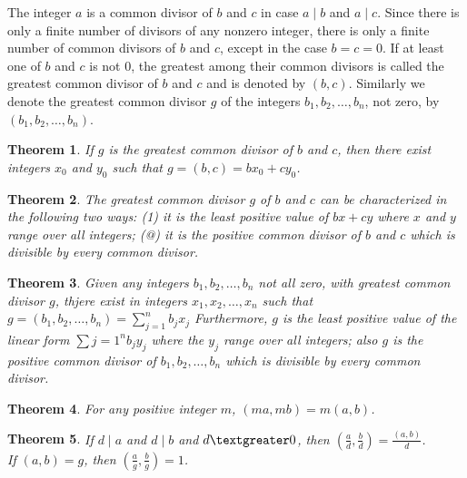 \documentclass[11pt]{article} %
\newtheorem{theorem}{Theorem}[section]
\newenvironment{definition}[1][Definition]{\begin{trivlist}
\item[\hskip \labelsep {\bfseries #1}]}{\end{trivlist}}
\begin{document}
\begin{definition}
	The integer $a$ is a common divisor of $b$ and $c$ in case $ a\mid b$ and $a \mid c$. Since there is only a finite number of divisors of any nonzero integer, there is only a finite number of common divisors of $b$ and $c$, except in the case $ b = c = 0$. If at least one of $b$ and $c$ is not 0, the greatest among their common divisors is called the greatest common divisor of $b$ and $c$ and is denoted by $(b, c)$. Similarly we denote the greatest common divisor $g$ of the integers $b_1, b_2, \ldots , b_n$, not zero, by $(b_1, b_2,\ldots , b_n)$. 

\end{definition}

\begin{theorem}
	If $g$ is the greatest common divisor of $b$ and $c$, then there exist integers $x_0$ and $y_0$ such that $g = (b, c) = bx_0 + cy_0$. 
\end{theorem}

\begin{theorem}
	The greatest common divisor $g$ of $b$ and $c$ can be characterized in the following two ways: (1) it is the least positive value of $bx + cy$ where $x$ and $y$ range over all integers; (@) it is the positive common divisor of $b$ and $c$ which is divisible by every common divisor. 
\end{theorem}

\begin{theorem}
	Given any integers $b_1, b_2, \ldots, b_n$ not all zero, with greatest common divisor $g$, thjere exist in integers $x_1, x_2, \ldots, x_n$ such that $ g = (b_1, b_2, \ldots, b_n) = \sum_{j = 1}^{n}{{b_j}{x_j}}$ Furthermore, $g$ is the least positive value of the linear form $ \sum{j = 1}^{n}{{b_j}{y_j}} $ where the $y_j$ range over all integers; also $g$ is the positive common divisor of $b_1, b_2, \ldots, b_n$ which is divisible by every common divisor. 
 
\end{theorem}

\begin{theorem}
	For any positive integer $m$, $(ma, mb) = m(a, b)$. 
\end{theorem}

\begin{theorem}
	If $d \mid a$ and $d \mid b$ and $d \textgreater 0$, then $ (\frac{a}{d}, \frac{b}{d}) = \frac{(a, b)}{d}$.
\\	If $(a, b) = g$, then $(\frac{a}{g}, \frac{b}{g}) = 1$.
\end{theorem}
\end{document}
